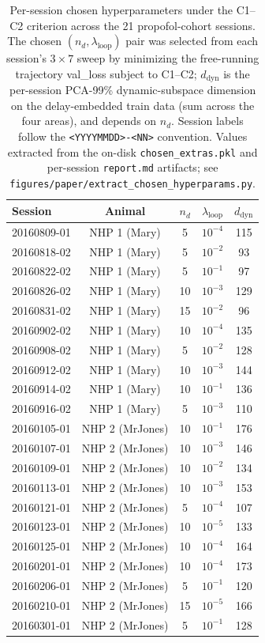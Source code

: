 \begin{table}[h!]
\centering
\small
\caption[Per-session chosen hyperparameters]{Per-session chosen hyperparameters under the C1--C2 criterion across the 21 propofol-cohort sessions. The chosen $(n_{d},\lambda_{\mathrm{loop}})$ pair was selected from each session's $3\times 7$ sweep by minimizing the free-running trajectory val\_loss subject to C1--C2; $d_{\mathrm{dyn}}$ is the per-session PCA-99\% dynamic-subspace dimension on the delay-embedded train data (sum across the four areas), and depends on $n_{d}$. Session labels follow the \texttt{<YYYYMMDD>-<NN>} convention. Values extracted from the on-disk \texttt{chosen\_extras.pkl} and per-session \texttt{report.md} artifacts; see \texttt{figures/paper/extract\_chosen\_hyperparams.py}.}
\label{tab:supp-interareal-control-perchosen}
\begin{tabular}{lcccc}
\toprule
Session & Animal & $n_{d}$ & $\lambda_{\mathrm{loop}}$ & $d_{\mathrm{dyn}}$ \\
\midrule
20160809-01 & NHP 1 (Mary) & 5 & $10^{-4}$ & 115 \\
20160818-02 & NHP 1 (Mary) & 5 & $10^{-2}$ & 93 \\
20160822-02 & NHP 1 (Mary) & 5 & $10^{-1}$ & 97 \\
20160826-02 & NHP 1 (Mary) & 10 & $10^{-3}$ & 129 \\
20160831-02 & NHP 1 (Mary) & 15 & $10^{-2}$ & 96 \\
20160902-02 & NHP 1 (Mary) & 10 & $10^{-4}$ & 135 \\
20160908-02 & NHP 1 (Mary) & 5 & $10^{-2}$ & 128 \\
20160912-02 & NHP 1 (Mary) & 10 & $10^{-3}$ & 144 \\
20160914-02 & NHP 1 (Mary) & 10 & $10^{-1}$ & 136 \\
20160916-02 & NHP 1 (Mary) & 5 & $10^{-3}$ & 110 \\
\midrule
20160105-01 & NHP 2 (MrJones) & 10 & $10^{-1}$ & 176 \\
20160107-01 & NHP 2 (MrJones) & 10 & $10^{-3}$ & 146 \\
20160109-01 & NHP 2 (MrJones) & 10 & $10^{-2}$ & 134 \\
20160113-01 & NHP 2 (MrJones) & 10 & $10^{-3}$ & 153 \\
20160121-01 & NHP 2 (MrJones) & 5 & $10^{-4}$ & 107 \\
20160123-01 & NHP 2 (MrJones) & 10 & $10^{-5}$ & 133 \\
20160125-01 & NHP 2 (MrJones) & 10 & $10^{-4}$ & 164 \\
20160201-01 & NHP 2 (MrJones) & 10 & $10^{-4}$ & 173 \\
20160206-01 & NHP 2 (MrJones) & 5 & $10^{-1}$ & 120 \\
20160210-01 & NHP 2 (MrJones) & 15 & $10^{-5}$ & 166 \\
20160301-01 & NHP 2 (MrJones) & 5 & $10^{-1}$ & 128 \\
\bottomrule
\end{tabular}
\end{table}

